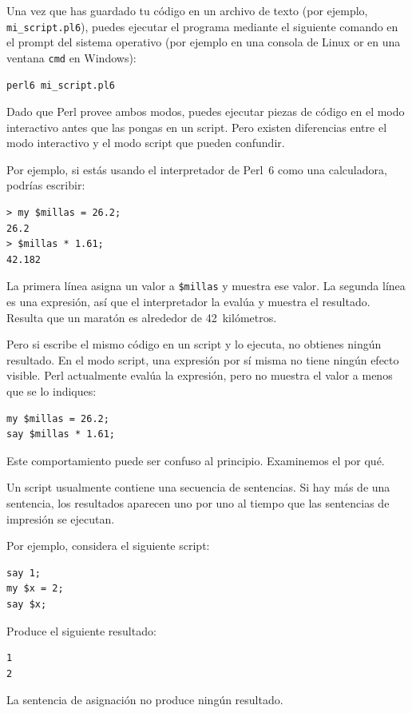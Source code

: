 Una vez que has guardado tu código en un archivo de texto (por ejemplo,
\verb|mi_script.pl6|), puedes ejecutar el programa mediante el siguiente
comando en el prompt del sistema operativo (por ejemplo en una consola de 
Linux or en una ventana \verb|cmd| en Windows):
\begin{lstlisting}
perl6 mi_script.pl6
\end{lstlisting}

Dado que Perl provee ambos modos, 
puedes ejecutar piezas de código en el modo interactivo 
antes que las pongas en un script. Pero existen diferencias entre 
el modo interactivo y el modo script que pueden confundir.

Por ejemplo, si estás usando el interpretador de Perl~6 como una
calculadora, podrías escribir:

\begin{lstlisting}
> my $millas = 26.2;
26.2
> $millas * 1.61;
42.182
\end{lstlisting}

La primera línea asigna un valor a {\tt \$millas} y muestra ese valor.
La segunda línea es una expresión, así que el interpretador la evalúa
y muestra el resultado. Resulta que un maratón es alrededor de 42~kilómetros.

Pero si escribe el mismo código en un script y lo ejecuta, no obtienes
ningún resultado. En el modo script, una expresión por sí misma no tiene
ningún efecto visible. Perl actualmente evalúa la expresión, pero no muestra
el valor a menos que se lo indiques:

\begin{lstlisting}
my $millas = 26.2;
say $millas * 1.61;
\end{lstlisting}

Este comportamiento puede ser confuso al principio. Examinemos
el por qué.

Un script usualmente contiene una secuencia de sentencias. Si hay más 
de una sentencia, los resultados aparecen uno por uno al 
tiempo que las sentencias de impresión se ejecutan.

Por ejemplo, considera el siguiente script:

\begin{lstlisting}
say 1;
my $x = 2;
say $x;
\end{lstlisting}
%
Produce el siguiente resultado:

\begin{lstlisting}
1
2
\end{lstlisting}
%
La sentencia de asignación no produce ningún resultado.

